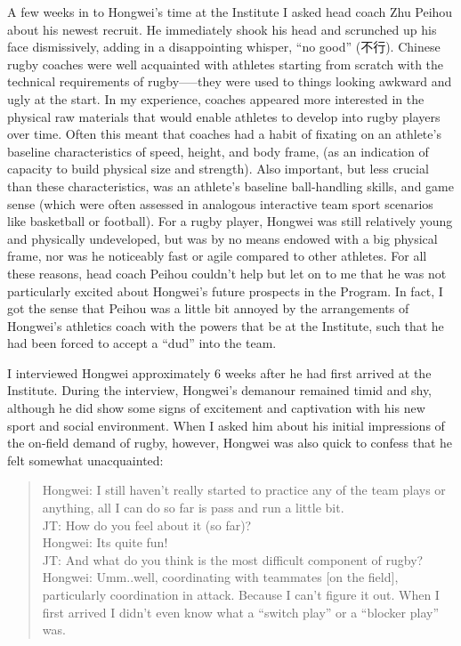 
A few weeks in to Hongwei’s time at the Institute I asked head coach Zhu Peihou about his newest recruit.  He immediately shook his head and scrunched up his face dismissively, adding in a disappointing whisper, ``no good'' (不行).  Chinese rugby coaches were well acquainted with athletes starting from scratch with the technical requirements of rugby—--they were used to things looking awkward and ugly at the start.  In my experience, coaches appeared more interested in the physical raw materials that would enable athletes to develop into rugby players over time.  Often this meant that coaches had a habit of fixating on an athlete's baseline characteristics of speed, height, and body frame, (as an indication of capacity to build physical size and strength).  Also important, but less crucial than these characteristics, was an athlete’s baseline ball-handling skills, and game sense (which were often assessed in analogous interactive team sport scenarios like basketball or football).  For a rugby player, Hongwei was still relatively young and physically undeveloped, but was by no means endowed with a big physical frame, nor was he noticeably fast or agile compared to other athletes.  For all these reasons, head coach Peihou couldn’t help but let on to me that he was not particularly excited about Hongwei's future prospects in the Program.  In fact, I got the sense that Peihou was a little bit annoyed by the arrangements of Hongwei’s athletics coach with the powers that be at the Institute, such that he had been forced to accept a ``dud'' into the team.

I interviewed Hongwei approximately 6 weeks after he had first arrived at the Institute.  During the interview, Hongwei's  demanour remained timid and shy, although he did show some signs of excitement and captivation with his new sport and social environment.  When I asked him about his initial impressions of the on-field demand of rugby, however, Hongwei was also quick to confess that he felt somewhat unacquainted:

\begin{quotation}
  Hongwei: I still haven’t really started to practice any of the team plays or anything, all I can do so far is pass and run a little bit. \\
  JT: How do you feel about it (so far)? \\
  Hongwei: Its quite fun! \\
  JT: And what do you think is the most difficult component of rugby? \\
  Hongwei: Umm..well, coordinating with teammates [on the field], particularly coordination in attack.  Because I can't figure it out. When I first arrived I didn’t even know what a ``switch play'' or a ``blocker play'' was.
\end{quotation}

